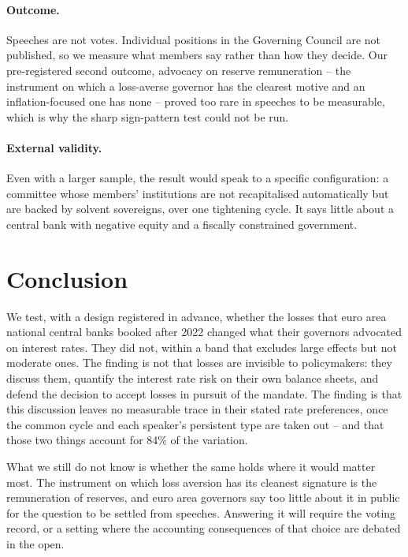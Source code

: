 \documentclass[11pt]{article}
\theoremstyle{plain}
\begin{document}
\paragraph{Outcome.} Speeches are not votes. Individual positions in the Governing Council are not published, so we measure what members say rather than how they decide. Our pre-registered second outcome, advocacy on reserve remuneration -- the instrument on which a loss-averse governor has the clearest motive and an inflation-focused one has none -- proved too rare in speeches to be measurable, which is why the sharp sign-pattern test could not be run.

\paragraph{External validity.} Even with a larger sample, the result would speak to a specific configuration: a committee whose members' institutions are not recapitalised automatically but are backed by solvent sovereigns, over one tightening cycle. It says little about a central bank with negative equity and a fiscally constrained government.

\section{Conclusion}

We test, with a design registered in advance, whether the losses that euro area national central banks booked after 2022 changed what their governors advocated on interest rates. They did not, within a band that excludes large effects but not moderate ones. The finding is not that losses are invisible to policymakers: they discuss them, quantify the interest rate risk on their own balance sheets, and defend the decision to accept losses in pursuit of the mandate. The finding is that this discussion leaves no measurable trace in their stated rate preferences, once the common cycle and each speaker's persistent type are taken out -- and that those two things account for 84\% of the variation.

What we still do not know is whether the same holds where it would matter most. The instrument on which loss aversion has its cleanest signature is the remuneration of reserves, and euro area governors say too little about it in public for the question to be settled from speeches. Answering it will require the voting record, or a setting where the accounting consequences of that choice are debated in the open.
\end{document}
